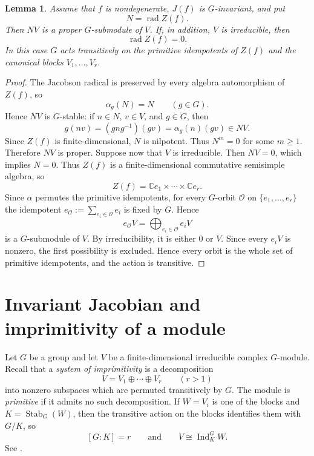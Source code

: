 \documentclass[11pt,reqno]{amsart}
\numberwithin{equation}{section}
\newtheorem{lemma}[theorem]{Lemma}
\theoremstyle{definition}
\theoremstyle{remark}
\newcommand{\C}{\mathbb C}
\newcommand{\Ind}{\operatorname{Ind}}
\newcommand{\Stab}{\operatorname{Stab}}
\newcommand{\rad}{\operatorname{rad}}
\begin{document}
\begin{lemma}\label{lem:radical-proper}
Assume that $f$ is nondegenerate,  $J(f)$ is $G$-invariant,
and put
\[
  N=\rad Z(f).
\]
Then $NV$ is a proper $G$-submodule of $V$. If, in addition, $V$ is irreducible, then
\begin{equation*}%
  \rad Z(f)=0.
\end{equation*}
In this case $G$ acts transitively on the primitive idempotents of
$Z(f)$ and  the canonical blocks $V_1,\dots,V_r$.
\end{lemma}

\begin{proof}
The Jacobson radical is preserved by every algebra automorphism of
$Z(f)$, so
\[
  \alpha_g(N)=N
  \qquad(g\in G).
\]
Hence $NV$ is $G$-stable: if $n\in N$, $v\in V$, and $g\in G$, then
\[
  g(nv)
  =
  (gng^{-1})(gv)
  =
  \alpha_g(n)(gv)
  \in NV.
\]
Since $Z(f)$ is finite-dimensional, $N$ is nilpotent.  Thus
$N^m=0$ for some $m\geq1$. Therefore $NV$ is proper. Suppose now that $V$ is irreducible.  Then $NV=0$, which implies $N=0$.  Thus $Z(f)$ is a
finite-dimensional commutative semisimple algebra, so
\[
  Z(f)
  =
  \C e_1\times \cdots\times \C e_r.
\]
 Since $\alpha$ permutes the
primitive idempotents, for every $G$-orbit $\mathcal O$ on
$\{e_1,\ldots,e_r\}$ the idempotent $e_{\mathcal O}
  :=
  \sum_{e_i\in\mathcal O}e_i$
is fixed by $G$.  Hence
\[
  e_{\mathcal O}V
  =
  \bigoplus_{e_i\in\mathcal O}e_iV
\]
is a $G$-submodule of $V$.  By irreducibility, it is either $0$ or
$V$.  Since every $e_iV$ is nonzero, the first possibility is
excluded.  Hence every orbit is the whole set of primitive
idempotents, and the action is transitive.
\end{proof}


\section{Invariant Jacobian and imprimitivity of a module}
\label{sec:imprimitivity}

Let $G$ be a group and let $V$ be a finite-dimensional irreducible
complex $G$-module.  Recall that a \emph{system of imprimitivity} is
a decomposition
\begin{equation}\label{eq:imprimitivity-system}
  V=V_1\oplus\cdots\oplus V_r 
  \qquad (r>1)
\end{equation}
into nonzero subspaces which are permuted transitively by $G$.
The module is \emph{primitive} if it admits no such decomposition.
If $W=V_i$ is one of the blocks and  $K=\Stab_G(W)$, then the transitive action on the blocks identifies them with $G/K$, so
\[
  [G:K]=r
  \qquad\text{and}\qquad
  V\cong\Ind_K^G W.
\]
See \cite[Definition~5.7 and Theorem~5.9]{Isaacs}.
\end{document}
